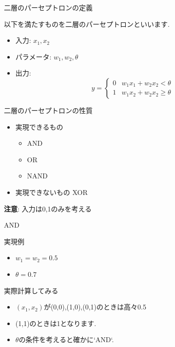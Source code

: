 \begin{frame}[fragile]{二層のパーセプトロンの定義}

\begin{screen}
\begin{dfn}
以下を満たすものを二層のパーセプトロンといいます.
\begin{itemize}
\item 入力: $x_1, x_2$
\item パラメータ: $w_1, w_2, \theta$
\item 出力:
\begin{equation*}
y = \left\{
\begin{array}{ll}
0 & w_1 x_1 + w_2 x_2 < \theta \\
1 & w_1 x_2 + w_2x_2 \ge \theta
\end{array}
\right.
\end{equation*}
\end{itemize}
\end{dfn}
\end{screen}
\end{frame}


\begin{frame}[fragile]{二層のパーセプトロンの性質}
\begin{itemize}
\item 実現できるもの
  \begin{itemize}
  \item AND
  \item OR
  \item NAND
  \end{itemize}
\item 実現できないもの
   XOR
\end{itemize}

\textbf{注意}: 入力は0,1のみを考える
\end{frame}

\begin{frame}[fragile]{AND}

実現例
\begin{itemize}
  \item $w_1 = w_2 = 0.5$
  \item $\theta = 0.7$
\end{itemize}

実際計算してみる
\begin{itemize}
\item $(x_1, x_2)$が(0,0),(1,0),(0,1)のときは高々0.5
\item (1,1)のときは1となります.
\item $\theta$の条件を考えると確かに`AND`.
\end{itemize}

\end{frame}

